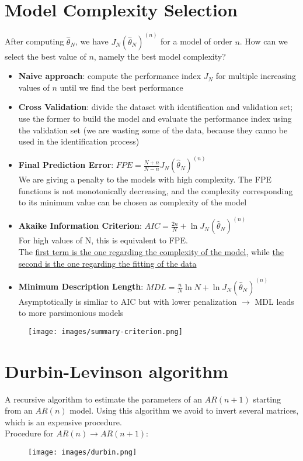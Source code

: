 \documentclass[10pt,a4paper]{article}
\begin{document}
\section{Model Complexity Selection}
After computing $\hat{\theta}_N$, we have $J_N(\hat{\theta}_N)^{(n)}$ for a model of order $n$. How can we select the best value of $n$, namely the best model complexity?
\begin{itemize}
	\item \textbf{Naive approach}: compute the performance index $J_N$ for multiple increasing values of $n$ until we find the best performance
	\item \textbf{Cross Validation}: divide the dataset with identification and validation set; use the former to build the model and evaluate the performance index using the validation set (we are wasting some of the data, because they canno be used in the identification process)
	\item \textbf{Final Prediction Error}: $FPE=\frac{N+n}{N-n}J_N(\hat{\theta}_N)^{(n)}$ \\
	We are giving a penalty to the models with high complexity. The FPE functions is not monotonically decreasing, and the complexity corresponding to its minimum value can be chosen as complexity of the model
	\item \textbf{Akaike Information Criterion}: $AIC=\frac{2n}{N}+\ln{J_N(\hat{\theta}_N)^{(n)}}$ \\ For high values of N, this is equivalent to FPE. \\ The \uline{first term is the one regarding the complexity of the model}, while \uline{the second is the one regarding the fitting of the data}
	\item \textbf{Minimum Description Length}: $MDL=\frac{n}{N}\ln{N}+\ln{J_N(\hat{\theta}_N)^{(n)}}$ \\
	Asymptotically is simliar to AIC but with lower penalization $\rightarrow$ MDL leads to more parsimonious models
\end{itemize}
 \begin{figure}[h!]
 \hfill \texttt{[image: images/summary-criterion.png]}\hspace*{\fill}
  \label{fig:summary-criterion}
\end{figure}
\pagebreak
\section{Durbin-Levinson algorithm}
A recursive algorithm to estimate the parameters of an $AR(n+1)$ starting from an $AR(n)$ model. Using this algorithm we avoid to invert several matrices, which is an expensive procedure. \\
Procedure for $AR(n) \rightarrow AR(n+1)$:
 \begin{figure}[h!]
 \hfill \texttt{[image: images/durbin.png]}\hspace*{\fill}
  \label{fig:durbin}
\end{figure} 
\end{document}

